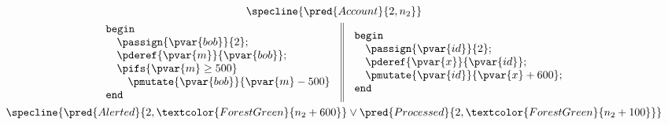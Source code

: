 \begin{center}
\begin{gather*}
\specline{\pred{Account}{2, n_2}} \\
\begin{array}{c || c}
	\begin{array}{l}
		\mathtt{begin} \\
			\quad \passign{\pvar{bob}}{2}; \\
			\quad \pderef{\pvar{m}}{\pvar{bob}}; \\
			\quad \pifs{\pvar{m} \geq 500} \\
			\quad \quad \pmutate{\pvar{bob}}{\pvar{m} - 500} \\
		\mathtt{end}
	\end{array}
	&
	\begin{array}{l}
		\mathtt{begin} \\
			\quad \passign{\pvar{id}}{2}; \\
			\quad \pderef{\pvar{x}}{\pvar{id}}; \\
			\quad \pmutate{\pvar{id}}{\pvar{x} + 600}; \\
		\mathtt{end}
	\end{array}
\end{array} \\
\specline{
	\pred{Alerted}{2, \textcolor{ForestGreen}{n_2 + 600}}
		\lor
	\pred{Processed}{2, \textcolor{ForestGreen}{n_2 + 100}}
}
\end{gather*}
\label{fig:proofPar}
\end{center}